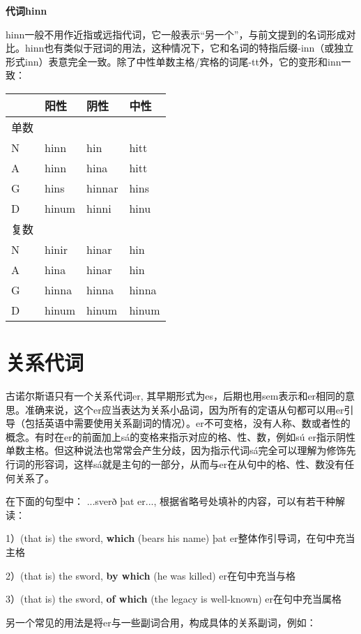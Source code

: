 \textbf{代词hinn}

hinn一般不用作近指或远指代词，它一般表示``另一个''，与前文提到的名词形成对比。hinn也有类似于冠词的用法，这种情况下，它和名词的特指后缀-inn（或独立形式inn）表意完全一致。除了中性单数主格/宾格的词尾-tt外，它的变形和inn一致：

\begin{longtable}{llll}
  \toprule
       & 阳性  & 阴性   & 中性  \\
  \midrule
  \endhead
  \bottomrule
  \endfoot
  单数 &       &        &       \\
  N    & hinn  & hin    & hitt  \\
  A    & hinn  & hina   & hitt  \\
  G    & hins  & hinnar & hins  \\
  D    & hinum & hinni  & hinu  \\
  复数 &       &        &       \\
  N    & hinir & hinar  & hin   \\
  A    & hina  & hinar  & hin   \\
  G    & hinna & hinna  & hinna \\
  D    & hinum & hinum  & hinum \\
\end{longtable}

\section{关系代词}\label{关系代词}

古诺尔斯语只有一个关系代词er,
其早期形式为es，后期也用sem表示和er相同的意思。准确来说，这个er应当表达为关系小品词，因为所有的定语从句都可以用er引导（包括英语中需要使用关系副词的情况）。er不可变格，没有人称、数或者性的概念。有时在er的前面加上sá的变格来指示对应的格、性、数，例如sú
er指示阴性单数主格。但这种说法也常常会产生分歧，因为指示代词sá完全可以理解为修饰先行词的形容词，这样sá就是主句的一部分，从而与er在从句中的格、性、数没有任何关系了。

在下面的句型中： ...sverð þat er...,
根据省略号处填补的内容，可以有若干种解读：

1）(that is) the sword, \textbf{which} (bears his name)‌ þat
er整体作引导词，在句中充当主格

2）(that is) the sword, \textbf{by which} (he was killed)‌
er在句中充当与格

3）(that is) the sword, \textbf{of which} (the legacy is well-known)‌
er在句中充当属格

另一个常见的用法是将er与一些副词合用，构成具体的关系副词，例如：

